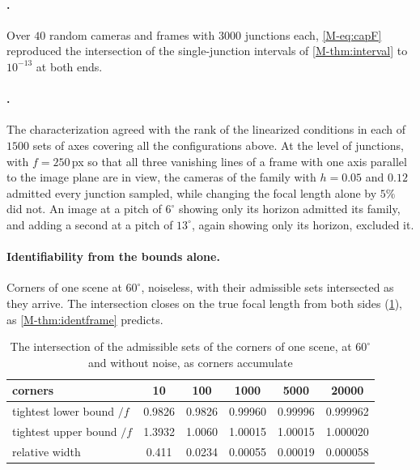 \paragraph{.} Over $40$ random cameras and frames with $3000$ junctions each, \eqref{M-eq:capF} reproduced the intersection of the single-junction intervals of \cref{M-thm:interval} to $10^{-13}$ at both ends.

\paragraph{.} The characterization agreed with the rank of the linearized conditions in each of $1500$ sets of axes covering all the configurations above. At the level of junctions, with $f=250$\,px so that all three vanishing lines of a frame with one axis parallel to the image plane are in view, the cameras of the family with $h=0.05$ and $0.12$ admitted every junction sampled, while changing the focal length alone by $5\%$ did not. An image at a pitch of $6^\circ$ showing only its horizon admitted its family, and adding a second at a pitch of $13^\circ$, again showing only its horizon, excluded it.

\paragraph{Identifiability from the bounds alone.} Corners of one scene at $60^\circ$, noiseless, with their admissible sets intersected as they arrive. The intersection closes on the true focal length from both sides (\cref{tab:close}), as \cref{M-thm:identframe} predicts.

\begin{table}[t]
\centering\small
\caption{The intersection of the admissible sets of the corners of one scene, at $60^\circ$ and without noise, as corners accumulate}
\label{tab:close}
\begin{tabular}{lccccc}
\toprule
corners & 10 & 100 & 1000 & 5000 & 20000\\
\midrule
tightest lower bound $/f$ & 0.9826 & 0.9826 & 0.99960 & 0.99996 & 0.999962\\
tightest upper bound $/f$ & 1.3932 & 1.0060 & 1.00015 & 1.00015 & 1.000020\\
relative width            & 0.411  & 0.0234 & 0.00055 & 0.00019 & 0.000058\\
\bottomrule
\end{tabular}
\end{table}

